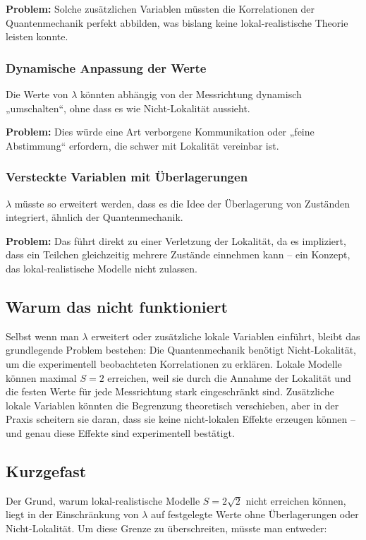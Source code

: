\documentclass[12pt,a4paper]{article}
\begin{document}
	\textbf{Problem:} Solche zusätzlichen Variablen müssten die Korrelationen der Quantenmechanik perfekt abbilden, was bislang keine lokal-realistische Theorie leisten konnte.
	
	\subsubsection{Dynamische Anpassung der Werte}
	Die Werte von $\lambda$ könnten abhängig von der Messrichtung dynamisch „umschalten“, ohne dass es wie Nicht-Lokalität aussieht.
	
	\textbf{Problem:} Dies würde eine Art verborgene Kommunikation oder „feine Abstimmung“ erfordern, die schwer mit Lokalität vereinbar ist.
	
	\subsubsection{Versteckte Variablen mit Überlagerungen}
	$\lambda$ müsste so erweitert werden, dass es die Idee der Überlagerung von Zuständen integriert, ähnlich der Quantenmechanik.
	
	\textbf{Problem:} Das führt direkt zu einer Verletzung der Lokalität, da es impliziert, dass ein Teilchen gleichzeitig mehrere Zustände einnehmen kann – ein Konzept, das lokal-realistische Modelle nicht zulassen.
	
	\subsection{Warum das nicht funktioniert}
	Selbst wenn man $\lambda$ erweitert oder zusätzliche lokale Variablen einführt, bleibt das grundlegende Problem bestehen: Die Quantenmechanik benötigt Nicht-Lokalität, um die experimentell beobachteten Korrelationen zu erklären. Lokale Modelle können maximal $S = 2$ erreichen, weil sie durch die Annahme der Lokalität und die festen Werte für jede Messrichtung stark eingeschränkt sind. Zusätzliche lokale Variablen könnten die Begrenzung theoretisch verschieben, aber in der Praxis scheitern sie daran, dass sie keine nicht-lokalen Effekte erzeugen können – und genau diese Effekte sind experimentell bestätigt.
	
	\subsection{Kurzgefast}
	Der Grund, warum lokal-realistische Modelle $S = 2 \sqrt{2}$ nicht erreichen können, liegt in der Einschränkung von $\lambda$ auf festgelegte Werte ohne Überlagerungen oder Nicht-Lokalität. Um diese Grenze zu überschreiten, müsste man entweder:
	
\end{document}
